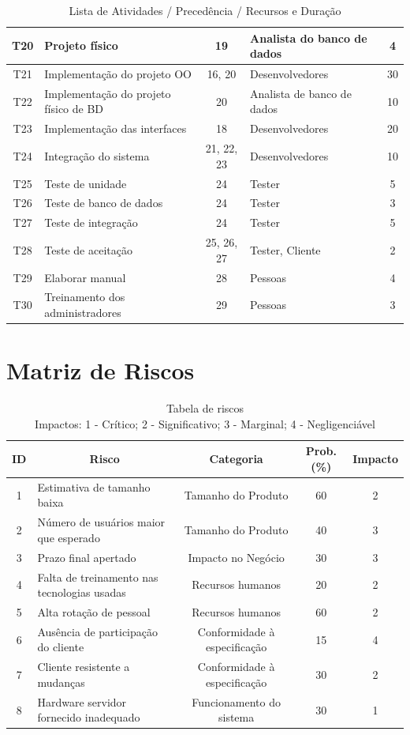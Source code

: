 \documentclass[a4paper,11pt]{article}
\begin{document}
\begin{center}
\begin{table}[H]
\begin{tabularx}{\textwidth}{c|X|c|X|c}
			T20 & Projeto físico & 19 & Analista do banco de dados & 4\\ \hline
			T21 & Implementação do projeto OO & 16, 20 & Desenvolvedores & 30 \\ \hline
			T22 & Implementação do projeto físico de BD& 20 & Analista de banco de dados & 10\\ \hline
			T23 & Implementação das interfaces & 18 & Desenvolvedores & 20\\ \hline
			T24 & Integração do sistema& 21, 22, 23 & Desenvolvedores & 10\\ \hline
			T25 & Teste de unidade & 24 & Tester & 5 \\ \hline
			T26 & Teste de banco de dados & 24 & Tester & 3 \\ \hline
			T27 & Teste de integração & 24 & Tester & 5\\ \hline
			T28 & Teste de aceitação& 25, 26, 27 & Tester, Cliente & 2\\ \hline
			T29 & Elaborar manual & 28 & Pessoas & 4\\ \hline
			T30 & Treinamento dos administradores & 29 & Pessoas & 3\\ \hline
		\end{tabularx}
		\caption{Lista de Atividades / Precedência / Recursos e Duração}
	\end{table}
	\end{center}
	
\section{Matriz de Riscos}
	
	\begin{table}[H]
		\begin{tabular}{c|l|c|c|c}
			\textbf{ID} & \multicolumn{1}{c|}{\textbf{Risco}} & \textbf{Categoria} & \textbf{Prob.(\%)} & \textbf{Impacto} \\
			\hline
			1 & Estimativa de tamanho baixa 				& Tamanho do Produto			& 60 & 2 \\
			2 & Número de usuários maior que esperado 		& Tamanho do Produto			& 40 & 3 \\
			3 & Prazo final apertado 						& Impacto no Negócio			& 30 & 3 \\
			4 & Falta de treinamento nas tecnologias usadas	& Recursos humanos				& 20 & 2 \\
			5 & Alta rotação de pessoal 					& Recursos humanos				& 60 & 2 \\
			6 & Ausência de participação do cliente			& Conformidade à especificação	& 15 & 4 \\
			7 & Cliente resistente a mudanças 				& Conformidade à especificação	& 30 & 2 \\
			8 & Hardware servidor fornecido inadequado		& Funcionamento do sistema		& 30 & 1 \\
		\end{tabular}
		\caption{Tabela de riscos\\Impactos: 1 - Crítico; 2 - Significativo; 3 - Marginal; 4 - Negligenciável}
	\end{table}
\end{document}
